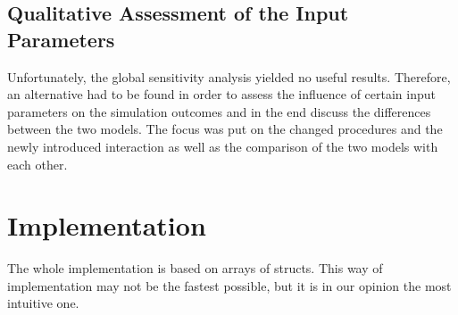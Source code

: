 \documentclass[11pt]{article}
\begin{document}
\subsection{Qualitative Assessment of the Input Parameters}
Unfortunately, the global sensitivity analysis yielded no useful results. Therefore, an alternative had to be found in order to assess the influence of certain input parameters on the simulation outcomes and in the end discuss the differences between the two models. The focus was put on the changed procedures and the newly introduced interaction as well as the comparison of the two models with each other.

\section{Implementation}
The whole implementation is based on arrays of structs. This way of implementation may not be the fastest possible, but it is in our opinion the most intuitive one.
\end{document}
